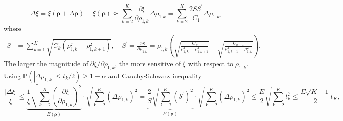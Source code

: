 %
\[
\Delta\xi=\xi(\boldsymbol{\rho}+\Delta \boldsymbol{\rho}) - \xi(\boldsymbol{\rho}) \approx \sum_{k=2}^K \frac{\partial \xi}{\partial \rho_{1,k}} \Delta\rho_{1,k} = \sum_{k=2}^K \frac{2SS^\prime}{C_1}\Delta\rho_{1,k},
\]
%
%
where 
%
\begin{align*}
S& = \sum_{k=1}^K\sqrt{C_k\left(\rho_{1,k}^2-\rho_{1,k+1}^2\right)},\quad
S^\prime = \frac{\partial  S}{\partial  \rho_{1,k}} = \rho_{1,k}\left(\sqrt{\frac{C_k}{\rho_{1,k}^2-\rho_{1,k+1}^2}} - \sqrt{\frac{C_{k-1}}{\rho_{1,k-1}^2-\rho_{1,k}^2}}\right).
\end{align*}
%
The larger the magnitude of $\partial \xi/\partial \rho_{1,k}$, the more sensitive of $\xi$ with respect to $\rho_{1,k}$. Using $\mathbb{P}(|\Delta \rho_{1,k}|\le t_k/2) \geq 1-\alpha$ and Cauchy-Schwarz inequality
%
\begin{equation}\label{eq:delta_xi_bound}
    \frac{\left|\Delta \xi\right|}{\xi}\le \underbrace{\frac{1}{\xi}\sqrt{\sum_{k=2}^K \left(\frac{\partial \xi}{\partial \rho_{1,k}}\right)^2}}_{E(\boldsymbol{\rho})} \cdot \sqrt{\sum_{k=2}^K\left(\Delta\rho_{1,k}\right)^2}=\underbrace{\frac{2}{S}\sqrt{\sum_{k=2}^K(S^\prime)^2} }_{E(\boldsymbol{\rho})}\cdot \sqrt{\sum_{k=2}^K\left(\Delta\rho_{1,k}\right)^2}\le \frac{E}{2} \sqrt{\sum_{k=2}^K t_k^2}\le \frac{E\sqrt{K-1}}{2}t_K,
\end{equation}
